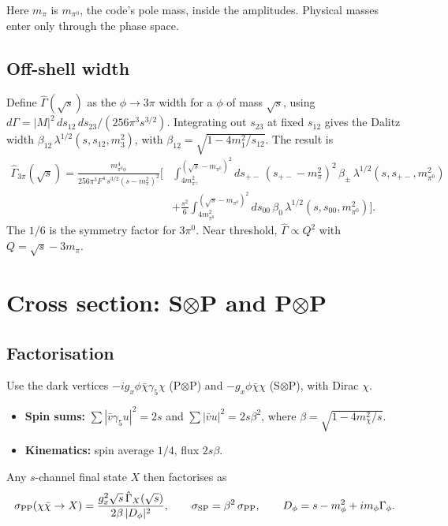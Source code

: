 \documentclass{article}
\newcommand{\spm}{s_{+-}}
\newcommand{\mpi}{m_\pi}
\newcommand{\lam}{\lambda^{1/2}}
\begin{document}
Here $\mpi$ is $m_{\pi^0}$, the code's pole mass, inside the amplitudes. Physical masses enter
only through the phase space.

\subsection{Off-shell width}

Define $\hat\Gamma(\sqrt s)$ as the $\phi\to3\pi$ width for a $\phi$ of mass $\sqrt s$, using
$d\Gamma=|M|^2\,ds_{12}\,ds_{23}/(256\pi^3s^{3/2})$. Integrating out $s_{23}$ at fixed $s_{12}$
gives the Dalitz width $\beta_{12}\,\lam(s,s_{12},m_3^2)$, with
$\beta_{12}=\sqrt{1-4m_{1}^2/s_{12}}$. The result is
\begin{equation}
\begin{split}
  \hat\Gamma_{3\pi}(\sqrt s)=\frac{m^4_{\pi^0\phi}}{256\pi^3F^4\,s^{3/2}(s-\mpi^2)^2}
  \Bigg[&\int_{4m_{\pi^\pm}^2}^{(\sqrt s-m_{\pi^0})^2}\!\!d\spm\,(\spm-\mpi^2)^2\,
  \beta_\pm\,\lam(s,\spm,m_{\pi^0}^2)\\
  &+\frac{s^2}{6}\int_{4m_{\pi^0}^2}^{(\sqrt s-m_{\pi^0})^2}\!\!ds_{00}\,
  \beta_0\,\lam(s,s_{00},m_{\pi^0}^2)\Bigg].
\end{split}
  \label{eq:Ghat}
\end{equation}
The $1/6$ is the symmetry factor for $3\pi^0$. Near threshold, $\hat\Gamma\propto Q^2$ with
$Q=\sqrt s-3\mpi$.

\section{Cross section: S$\otimes$P and P$\otimes$P}

\subsection{Factorisation}

Use the dark vertices $-ig_x\phi\bar\chi\gamma_5\chi$ (P$\otimes$P) and
$-g_x\phi\bar\chi\chi$ (S$\otimes$P), with Dirac $\chi$.
\begin{itemize}
\item \textbf{Spin sums:} $\sum|\bar v\gamma_5u|^2=2s$ and $\sum|\bar vu|^2=2s\beta^2$, where
  $\beta=\sqrt{1-4m_\chi^2/s}$.
\item \textbf{Kinematics:} spin average $1/4$, flux $2s\beta$.
\end{itemize}
Any $s$-channel final state $X$ then factorises as
\begin{equation}
  \sigma_{\rm PP}(\chi\bar\chi\to X)=\frac{g_x^2\sqrt s\,\hat\Gamma_X(\sqrt s)}{2\beta\,|D_\phi|^2},\qquad
  \sigma_{\rm SP}=\beta^2\,\sigma_{\rm PP},\qquad D_\phi=s-m_\phi^2+im_\phi\Gamma_\phi .
  \label{eq:sigfact}
\end{equation}
\end{document}
